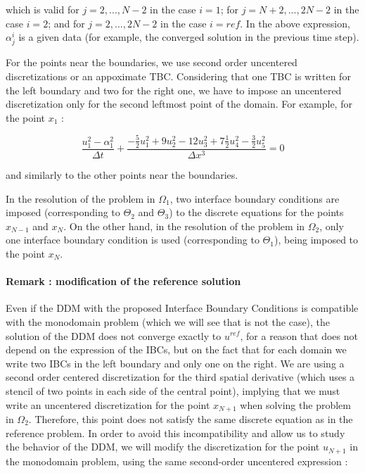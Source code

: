 \noindent which is valid for $j=2,...,N-2$ in the case $i=1$; for $j=N+2,...,2N-2$ in the case $i=2$; and for $j=2,...,2N-2$ in the case $i=ref$. In the above expression, $\alpha_j^i$ is a given data (for example, the converged solution in the previous time step).

\indent For the points near the boundaries, we use second order uncentered discretizations or an appoximate TBC. Considering that one TBC is written for the left boundary and two for the right one, we have to impose an uncentered discretization only for the second leftmost point of the domain. For example, for the point $x_1$ : 

\begin{equation}
    \label{eq:uncenteredFDdiscretization0}
    \frac{u_{1}^2 - \alpha_{1}^2}{\Delta t} + \frac{-\frac{5}{2}u_{1}^2 + 9u_{2}^2 - 12 u_{3}^2 + 7\frac{1}{2}u_{4}^2 -\frac{3}{2}u_{5}^2}{\Delta x ^3} = 0
\end{equation}

\noindent and similarly to the other points near the boundaries.

\indent In the resolution of the problem in $\Omega_1$, two interface boundary conditions are imposed (corresponding to $\Theta_2$ and $\Theta_3$) to the discrete equations for the points $x_{N-1}$ and $x_N$. On the other hand, in the resolution of the problem in $\Omega_2$, only one interface boundary condition is used (corresponding to $\Theta_1$), being imposed to the point $x_N$.

\paragraph{Remark : modification of the reference solution}

\indent  Even if the DDM with the proposed Interface Boundary Conditions is compatible with the monodomain problem (which we will see that is not the case), the solution of the DDM does not converge exactly to $u^{ref}$, for a reason that does not depend on the expression of the IBCs, but on the fact that for each domain we write two IBCs in the left boundary and only one on the right. We are using a second order centered discretization for the third spatial derivative (which uses a stencil of two points in each side of the central point), implying that we must write an uncentered discretization for the point $x_{N+1}$ when solving the problem in $\Omega_2$. Therefore, this point does not satisfy the same discrete equation as in the reference problem. In order to avoid this incompatibility and allow us to study the behavior of the DDM, we will modify the discretization for the point $u_{N+1}$ in the monodomain problem, using the same second-order uncentered expression :

